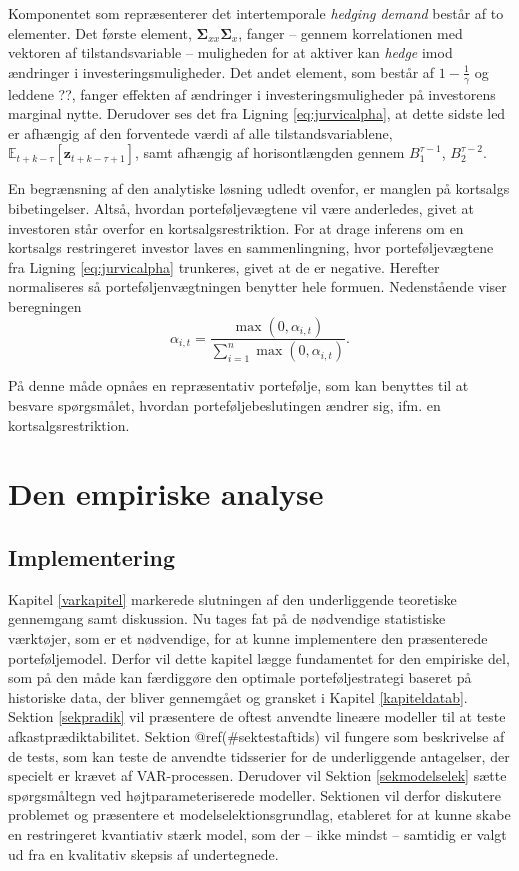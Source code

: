\documentclass[
  a4paper,
  oneside]{memoir}
\begin{document}
Komponentet som repræsenterer det intertemporale \emph{hedging demand} består af to elementer. Det første element, \(\bm{\Sigma}_{xx}\bm{\Sigma}_x\), fanger -- gennem korrelationen med vektoren af tilstandsvariable -- muligheden for at aktiver kan \emph{hedge} imod ændringer i investeringsmuligheder. Det andet element, som består af \(1-\tfrac{1}{\gamma}\) og leddene ??, fanger effekten af ændringer i investeringsmuligheder på investorens marginal nytte. Derudover ses det fra Ligning \eqref{eq:jurvicalpha}, at dette sidste led er afhængig af den forventede værdi af alle tilstandsvariablene, \(\mathbb{E}_{t+k-\tau}[\bm{z}_{t+k-\tau+1}]\), samt afhængig af horisontlængden gennem \(B_1^{\tau-1}\), \(B_2^{\tau-2}\).

En begrænsning af den analytiske løsning udledt ovenfor, er manglen på kortsalgs bibetingelser. Altså, hvordan porteføljevægtene vil være anderledes, givet at investoren står overfor en kortsalgsrestriktion. For at drage inferens om en kortsalgs restringeret investor laves en sammenlingning, hvor porteføljevægtene fra Ligning \eqref{eq:jurvicalpha} trunkeres, givet at de er negative. Herefter normaliseres så porteføljenvægtningen benytter hele formuen. Nedenstående viser beregningen
\[\alpha_{i,t}=\frac{\max(0,\alpha_{i,t})}{\sum_{i=1}^n \max(0,\alpha_{i,t})}.\]

På denne måde opnåes en repræsentativ portefølje, som kan benyttes til at besvare spørgsmålet, hvordan porteføljebeslutingen ændrer sig, ifm. en kortsalgsrestriktion.

\part{Den empiriske analyse}

\hypertarget{implementering}{%
\chapter{Implementering}\label{implementering}}

Kapitel \ref{varkapitel} markerede slutningen af den underliggende teoretiske gennemgang samt diskussion. Nu tages fat på de nødvendige statistiske værktøjer, som er et nødvendige, for at kunne implementere den præsenterede porteføljemodel. Derfor vil dette kapitel lægge fundamentet for den empiriske del, som på den måde kan færdiggøre den optimale porteføljestrategi baseret på historiske data, der bliver gennemgået og gransket i Kapitel \ref{kapiteldatab}. Sektion \ref{sekpradik} vil præsentere de oftest anvendte lineære modeller til at teste afkastprædiktabilitet. Sektion @ref(\#sektestaftids) vil fungere som beskrivelse af de tests, som kan teste de anvendte tidsserier for de underliggende antagelser, der specielt er krævet af VAR-processen. Derudover vil Sektion \ref{sekmodelselek} sætte spørgsmåltegn ved højtparameteriserede modeller. Sektionen vil derfor diskutere problemet og præsentere et modelselektionsgrundlag, etableret for at kunne skabe en restringeret kvantiativ stærk model, som der -- ikke mindst -- samtidig er valgt ud fra en kvalitativ skepsis af undertegnede.
\end{document}
